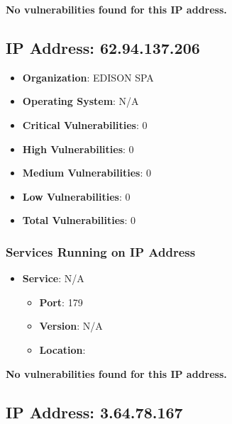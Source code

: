 \documentclass{article}
\begin{document}
\textbf{No vulnerabilities found for this IP address.}




\clearpage



\subsection*{IP Address: 62.94.137.206}

\begin{itemize}
    \item \textbf{Organization}: EDISON SPA
    \item \textbf{Operating System}:  N/A 
    \item \textbf{Critical Vulnerabilities}: 0
    \item \textbf{High Vulnerabilities}: 0
    \item \textbf{Medium Vulnerabilities}: 0
    \item \textbf{Low Vulnerabilities}: 0
    \item \textbf{Total Vulnerabilities}: 0
\end{itemize}

\subsubsection*{Services Running on IP Address}

\begin{itemize}
    
        \item \textbf{Service}: N/A
        \begin{itemize}
            \item \textbf{Port}: 179
            \item \textbf{Version}:  N/A 
            \item \textbf{Location}: \href{  }{  }
        \end{itemize}
    
\end{itemize}


\textbf{No vulnerabilities found for this IP address.}




\clearpage



\subsection*{IP Address: 3.64.78.167}
\end{document}
